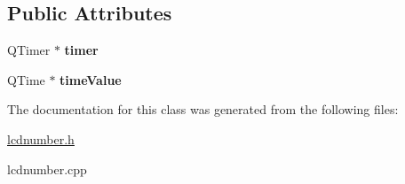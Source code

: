 \subsection*{Public Attributes}
\begin{DoxyCompactItemize}
\item 
\hypertarget{class_l_c_d_number_a019f65da6a0b2afb1977f569084d9ca6}{Q\-Timer $\ast$ {\bfseries timer}}\label{class_l_c_d_number_a019f65da6a0b2afb1977f569084d9ca6}

\item 
\hypertarget{class_l_c_d_number_a804920a35b3ec21429797d1aeff89a04}{Q\-Time $\ast$ {\bfseries time\-Value}}\label{class_l_c_d_number_a804920a35b3ec21429797d1aeff89a04}

\end{DoxyCompactItemize}


The documentation for this class was generated from the following files\-:\begin{DoxyCompactItemize}
\item 
\hyperlink{lcdnumber_8h}{lcdnumber.\-h}\item 
lcdnumber.\-cpp\end{DoxyCompactItemize}
